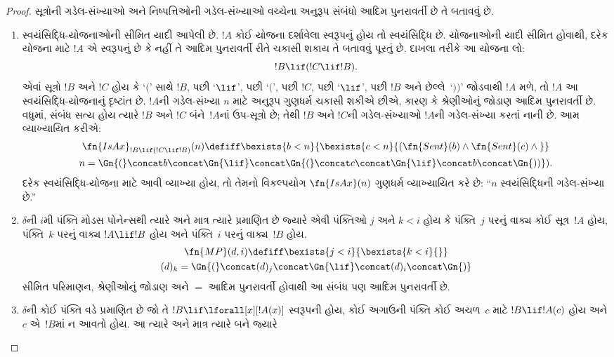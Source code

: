 \begin{proof}
સૂત્રોની ગડેલ-સંખ્યાઓ અને
નિષ્પત્તિઓની ગડેલ-સંખ્યાઓ વચ્ચેના
અનુરૂપ સંબંધો આદિમ પુનરાવર્તી છે
તે બતાવવું છે.
\begin{enumerate}
\item સ્વયંસિદ્ધિ-યોજનાઓની સીમિત યાદી
  આપેલી છે. $!A$ કોઈ યોજના દર્શાવેલા
  સ્વરૂપનું હોય તો સ્વયંસિદ્ધિ છે.
  યોજનાઓની યાદી સીમિત હોવાથી,
  દરેક યોજના માટે $!A$ એ સ્વરૂપનું
  છે કે નહીં તે આદિમ પુનરાવર્તી રીતે
  ચકાસી શકાય તે બતાવવું પૂરતું છે.
  દાખલા તરીકે આ યોજના લો:
  \[
  !B \lif (!C \lif !B).
  \]
  એવાં સૂત્રો $!B$ અને $!C$
  હોય કે `$($' સાથે $!B$, પછી
  `$\lif$', પછી `$($', પછી $!C$,
  પછી `$\lif$', પછી $!B$ અને
  છેલ્લે~`$))$' જોડવાથી $!A$ મળે,
  તો $!A$ આ સ્વયંસિદ્ધિ-યોજનાનું
  દૃષ્ટાંત છે. $!A$ની ગડેલ-સંખ્યા
  $n$ માટે અનુરૂપ ગુણધર્મ ચકાસી
  શકીએ છીએ, કારણ કે શ્રેણીઓનું
  જોડાણ આદિમ પુનરાવર્તી છે. વધુમાં,
  સંબંધ સત્ય હોય ત્યારે $!B$ અને
  $!C$ બંને~$!A$નાં ઉપ-સૂત્રો
  છે; તેથી $!B$ અને $!C$ની ગડેલ-સંખ્યાઓ
  $!A$ની ગડેલ-સંખ્યા કરતાં નાની
  છે. આમ વ્યાખ્યાયિત કરીએ:
  \begin{multline*}
  \fn{IsAx}_{!B \lif (!C \lif !B)}(n) \defiff \bexists{b< n}{
    \bexists{c < n}{(\fn{Sent}(b) \land \fn{Sent}(c) \land {}}}\\ n =
  \Gn{(} \concat b \concat \Gn{\lif} \concat \Gn{(} \concat c \concat
  \Gn{\lif} \concat b \concat \Gn{))}).
  \end{multline*}
  દરેક સ્વયંસિદ્ધિ-યોજના માટે આવી
  વ્યાખ્યા હોય, તો તેમનો વિકલ્પયોગ
  $\fn{IsAx}(n)$ ગુણધર્મ વ્યાખ્યાયિત
  કરે છે: ``$n$ સ્વયંસિદ્ધિની
  ગડેલ-સંખ્યા છે.''
\item $\delta$ની $i$મી પંક્તિ
  મોડસ પોનેન્સથી ત્યારે અને માત્ર
  ત્યારે પ્રમાણિત છે જ્યારે એવી
  પંક્તિઓ $j$ અને $k < i$ હોય કે
  પંક્તિ~$j$ પરનું વાક્ય
  કોઈ સૂત્ર~$!A$ હોય, પંક્તિ~$k$
  પરનું વાક્ય $!A \lif !B$ હોય
  અને પંક્તિ~$i$ પરનું વાક્ય~$!B$ હોય.
  \begin{multline*}
    \fn{MP}(d, i) \defiff \bexists{j < i}{\bexists{k < i}{}}\\
    (d)_k = \Gn{(} \concat (d)_j
      \concat \Gn{\lif} \concat (d)_i \concat \Gn{)}
  \end{multline*}
  સીમિત પરિમાણન, શ્રેણીઓનું જોડાણ
  અને $=$ આદિમ પુનરાવર્તી હોવાથી
  આ સંબંધ પણ આદિમ પુનરાવર્તી છે.
\item $\delta$ની કોઈ પંક્તિ
  \QR{} વડે પ્રમાણિત છે જો તે
  $!B \lif \lforall[x][!A(x)]$
  સ્વરૂપની હોય, કોઈ અગાઉની પંક્તિ
  કોઈ અચળ~$c$ માટે
  $!B \lif !A(c)$ હોય અને $c$
  એ~$!B$માં ન આવતો હોય. આ ત્યારે
  અને માત્ર ત્યારે બને જ્યારે
  \begin{enumerate}

\end{enumerate}
\end{enumerate}
\end{proof}
